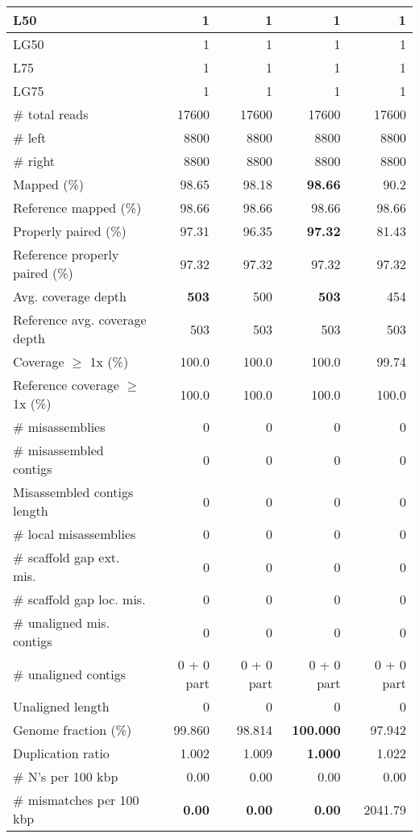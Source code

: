 \documentclass[12pt,a4paper]{article}
\begin{document}
\begin{table}[ht]
\begin{center}
\begin{tabular}{|l*{4}{|r}|}
L50 & 1 & 1 & 1 & 1 \\ \hline
LG50 & 1 & 1 & 1 & 1 \\ \hline
L75 & 1 & 1 & 1 & 1 \\ \hline
LG75 & 1 & 1 & 1 & 1 \\ \hline
\# total reads & 17600 & 17600 & 17600 & 17600 \\ \hline
\# left & 8800 & 8800 & 8800 & 8800 \\ \hline
\# right & 8800 & 8800 & 8800 & 8800 \\ \hline
Mapped (\%) & 98.65 & 98.18 & {\bf 98.66} & 90.2 \\ \hline
Reference mapped (\%) & 98.66 & 98.66 & 98.66 & 98.66 \\ \hline
Properly paired (\%) & 97.31 & 96.35 & {\bf 97.32} & 81.43 \\ \hline
Reference properly paired (\%) & 97.32 & 97.32 & 97.32 & 97.32 \\ \hline
Avg. coverage depth & {\bf 503} & 500 & {\bf 503} & 454 \\ \hline
Reference avg. coverage depth & 503 & 503 & 503 & 503 \\ \hline
Coverage $\geq$ 1x (\%) & 100.0 & 100.0 & 100.0 & 99.74 \\ \hline
Reference coverage $\geq$ 1x (\%) & 100.0 & 100.0 & 100.0 & 100.0 \\ \hline
\# misassemblies & 0 & 0 & 0 & 0 \\ \hline
\# misassembled contigs & 0 & 0 & 0 & 0 \\ \hline
Misassembled contigs length & 0 & 0 & 0 & 0 \\ \hline
\# local misassemblies & 0 & 0 & 0 & 0 \\ \hline
\# scaffold gap ext. mis. & 0 & 0 & 0 & 0 \\ \hline
\# scaffold gap loc. mis. & 0 & 0 & 0 & 0 \\ \hline
\# unaligned mis. contigs & 0 & 0 & 0 & 0 \\ \hline
\# unaligned contigs & 0 + 0 part & 0 + 0 part & 0 + 0 part & 0 + 0 part \\ \hline
Unaligned length & 0 & 0 & 0 & 0 \\ \hline
Genome fraction (\%) & 99.860 & 98.814 & {\bf 100.000} & 97.942 \\ \hline
Duplication ratio & 1.002 & 1.009 & {\bf 1.000} & 1.022 \\ \hline
\# N's per 100 kbp & 0.00 & 0.00 & 0.00 & 0.00 \\ \hline
\# mismatches per 100 kbp & {\bf 0.00} & {\bf 0.00} & {\bf 0.00} & 2041.79 \\ \hline

\end{tabular}
\end{center}
\end{table}
\end{document}
